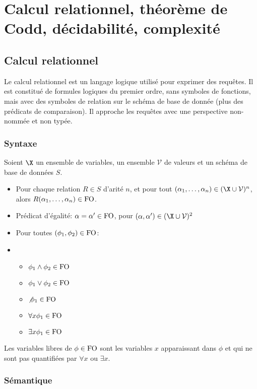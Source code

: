 \documentclass[french, toc]{../cs-classes/cs-classes}
\newcommand*{\V}{\mathcal{V}}
\begin{document}
\section{Calcul relationnel, théorème de Codd, décidabilité, complexité}
\subsection{Calcul relationnel}
Le calcul relationnel est un langage logique utilisé pour exprimer des requêtes. Il est constitué de formules logiques du premier ordre, sans symboles de fonctions, mais avec des symboles de relation sur le schéma de base de donnée (plus des prédicats de comparaison). Il approche les requêtes avec une perspective non-nommée et non typée.

\subsubsection{Syntaxe}
Soient $\X$ un ensemble de variables, un ensemble $\V$ de valeurs et un schéma de base de données $S$. 
\begin{itemize}
    \item Pour chaque relation $R\in S$ d'arité $n$, et pour tout $(\alpha_1, \dots, \alpha_n)\in(\X\cup\V)^n$, alors $R(\alpha_1, \dots, \alpha_n)\in\textnormal{FO}$.
    \item Prédicat d'égalité: $\alpha=\alpha'\in\textnormal{FO}$, pour $(\alpha, \alpha')\in(\X\cup\V)^2$
    \item Pour toutes $(\phi_1, \phi_2)\in\textnormal{FO}$:
    \item \begin{itemize}
        \item $\phi_1\land\phi_2\in\textnormal{FO}$
        \item $\phi_1\lor\phi_2\in\textnormal{FO}$
        \item $\not\phi_1\in\textnormal{FO}$
        \item $\forall x \phi_1 \in\textnormal{FO}$
        \item $\exists x \phi_1 \in\textnormal{FO}$
    \end{itemize}
\end{itemize}
Les variables libres de $\phi\in\textnormal{FO}$ sont les variables $x$ apparaissant dans $\phi$ et qui ne sont pas quantifiées par $\forall x$ ou $\exists x$.

\subsubsection{Sémantique}
\end{document}
